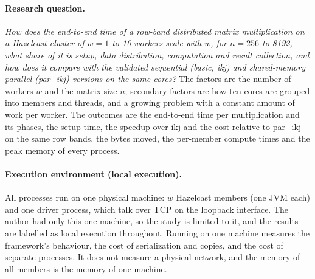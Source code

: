 \documentclass[11pt,a4paper]{article}
\begin{document}
\paragraph{Research question.} \emph{How does the end-to-end time of a
row-band distributed matrix multiplication on a Hazelcast cluster of $w=1$ to
10 workers scale with $w$, for $n=256$ to 8192, what share of it is setup,
data distribution, computation and result collection, and how does it compare
with the validated sequential (basic, ikj) and shared-memory parallel
(par\_ikj) versions on the same cores?} The factors are the number of workers
$w$ and the matrix size $n$; secondary factors are how ten cores are grouped
into members and threads, and a growing problem with a constant amount of work
per worker. The outcomes are the end-to-end time per multiplication and its
phases, the setup time, the speedup over ikj and the cost relative to par\_ikj
on the same row bands, the bytes moved, the per-member compute times and the
peak memory of every process.

\paragraph{Execution environment (local execution).} All processes run on one
physical machine: $w$ Hazelcast members (one JVM each) and one driver process,
which talk over TCP on the loopback interface. The author had only this one
machine, so the study is limited to it, and the results are labelled as local
execution throughout. Running on one machine measures the framework's behaviour, the cost of serialization and copies, and
the cost of separate processes. It does not measure a physical network, and the
memory of all members is the memory of one machine.
\end{document}
